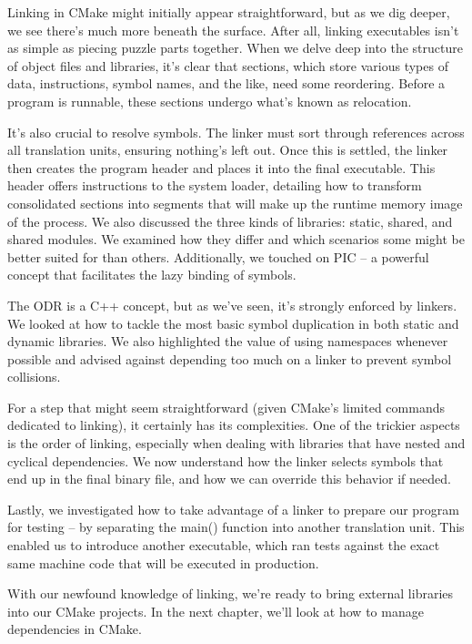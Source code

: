 Linking in CMake might initially appear straightforward, but as we dig deeper, we see there’s much more beneath the surface. After all, linking executables isn’t as simple as piecing puzzle parts together. When we delve deep into the structure of object files and libraries, it’s clear that sections, which store various types of data, instructions, symbol names, and the like, need some reordering. Before a program is runnable, these sections undergo what’s known as relocation.

It’s also crucial to resolve symbols. The linker must sort through references across all translation units, ensuring nothing’s left out. Once this is settled, the linker then creates the program header and places it into the final executable. This header offers instructions to the system loader, detailing how to transform consolidated sections into segments that will make up the runtime memory image of the process. We also discussed the three kinds of libraries: static, shared, and shared modules. We examined how they differ and which scenarios some might be better suited for than others. Additionally, we touched on PIC – a powerful concept that facilitates the lazy binding of symbols.

The ODR is a C++ concept, but as we’ve seen, it’s strongly enforced by linkers. We looked at how to tackle the most basic symbol duplication in both static and dynamic libraries. We also highlighted the value of using namespaces whenever possible and advised against depending too much on a linker to prevent symbol collisions.

For a step that might seem straightforward (given CMake’s limited commands dedicated to linking), it certainly has its complexities. One of the trickier aspects is the order of linking, especially when dealing with libraries that have nested and cyclical dependencies. We now understand how the linker selects symbols that end up in the final binary file, and how we can override this behavior if needed.

Lastly, we investigated how to take advantage of a linker to prepare our program for testing – by separating the main() function into another translation unit. This enabled us to introduce another executable, which ran tests against the exact same machine code that will be executed in production.

With our newfound knowledge of linking, we’re ready to bring external libraries into our CMake projects. In the next chapter, we’ll look at how to manage dependencies in CMake.








